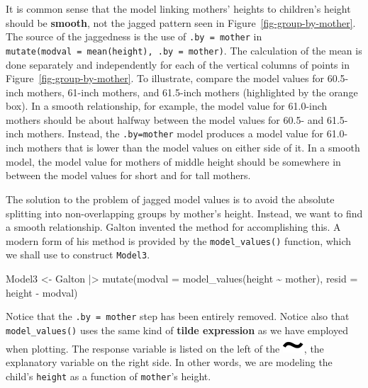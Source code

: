\documentclass[
  letterpaper,
  DIV=11,
  numbers=noendperiod,
  oneside]{scrartcl}
\newenvironment{Shaded}{\begin{snugshade}}{\end{snugshade}}
\newcommand{\AttributeTok}[1]{\textcolor[rgb]{0.40,0.45,0.13}{#1}}
\newcommand{\FunctionTok}[1]{\textcolor[rgb]{0.28,0.35,0.67}{#1}}
\newcommand{\NormalTok}[1]{\textcolor[rgb]{0.00,0.23,0.31}{#1}}
\newcommand{\OtherTok}[1]{\textcolor[rgb]{0.00,0.23,0.31}{#1}}
\newcommand{\SpecialCharTok}[1]{\textcolor[rgb]{0.37,0.37,0.37}{#1}}
\begin{document}
It is common sense that the model linking mothers' heights to children's
height should be \textbf{smooth}, not the jagged pattern seen in
Figure~\ref{fig-group-by-mother}. The source of the jaggedness is the
use of \texttt{.by\ =\ mother} in
\texttt{mutate(modval\ =\ mean(height),\ .by\ =\ mother)}. The
calculation of the mean is done separately and independently for each of
the vertical columns of points in Figure~\ref{fig-group-by-mother}. To
illustrate, compare the model values for 60.5-inch mothers, 61-inch
mothers, and 61.5-inch mothers (highlighted by the orange box). In a
smooth relationship, for example, the model value for 61.0-inch mothers
should be about halfway between the model values for 60.5- and 61.5-inch
mothers. Instead, the \texttt{.by=mother} model produces a model value
for 61.0-inch mothers that is lower than the model values on either side
of it. In a smooth model, the model value for mothers of middle height
should be somewhere in between the model values for short and for tall
mothers.

The solution to the problem of jagged model values is to avoid the
absolute splitting into non-overlapping groups by mother's height.
Instead, we want to find a smooth relationship. Galton invented the
method for accomplishing this. A modern form of his method is provided
by the \texttt{model\_values()} function, which we shall use to
construct \texttt{Model3}.

\begin{Shaded}
\begin{Highlighting}[]
\NormalTok{Model3 }\OtherTok{\textless{}{-}}\NormalTok{ Galton }\SpecialCharTok{|\textgreater{}}
  \FunctionTok{mutate}\NormalTok{(}\AttributeTok{modval =} \FunctionTok{model\_values}\NormalTok{(height }\SpecialCharTok{\textasciitilde{}}\NormalTok{ mother),}
         \AttributeTok{resid =}\NormalTok{ height }\SpecialCharTok{{-}}\NormalTok{ modval)}
\end{Highlighting}
\end{Shaded}

Notice that the \texttt{.by\ =\ mother} step has been entirely removed.
Notice also that \texttt{model\_values()} uses the same kind of
\textbf{tilde expression} as we have employed when plotting. The
response variable is listed on the left of the
\includegraphics{www/tilde.png}, the explanatory variable on the right
side. In other words, we are modeling the child's \texttt{height} as a
function of \texttt{mother}'s height.
\end{document}
